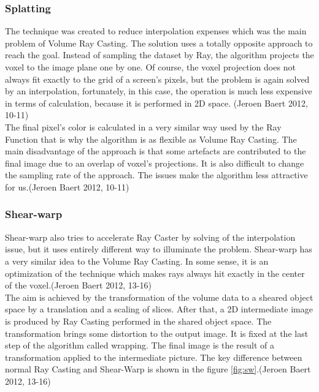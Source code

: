 \documentclass[twoside, english, 11pt]{report}
\begin{document}
\subsubsection{Splatting}

The technique was created to reduce interpolation expenses which was the main problem of Volume Ray Casting. The solution uses a totally opposite approach to reach the goal. Instead of sampling the dataset by Ray, the algorithm projects the voxel to the image plane one by one. Of course, the voxel projection does not always fit exactly to the grid of a screen's pixels, but the problem is again solved by an interpolation, fortunately, in this case, the operation is much less expensive in terms of calculation, because it is performed in 2D space. (Jeroen Baert 2012, 10-11)\\

The final pixel's color is calculated in a very similar way used by the Ray Function that is why the algorithm is as flexible as Volume Ray Casting. The main disadvantage of the approach is that some artefacts are contributed to the final image due to an overlap of voxel's projections. It is also difficult to change the sampling rate of the approach. The issues make the algorithm less attractive for us.(Jeroen Baert 2012, 10-11)\\

\subsubsection{Shear-warp}

Shear-warp also tries to accelerate Ray Caster by solving of the interpolation issue, but it uses entirely different way to illuminate the problem. Shear-warp has a very similar idea to the Volume Ray Casting. In some sense, it is an optimization of the technique which makes rays always hit exactly in the center of the voxel.(Jeroen Baert 2012, 13-16)\\

The aim is achieved by the transformation of the volume data to a sheared object space by a translation and a scaling of slices. After that, a 2D intermediate image is produced by Ray Casting performed in the shared object space. The transformation brings some distortion to the output image. It is fixed at the last step of the algorithm called wrapping. The final image is the result of a transformation applied to the intermediate picture. The key difference between normal Ray Casting and Shear-Warp is shown in the figure \ref{fig:sw}.(Jeroen Baert 2012, 13-16)\\
\end{document}
